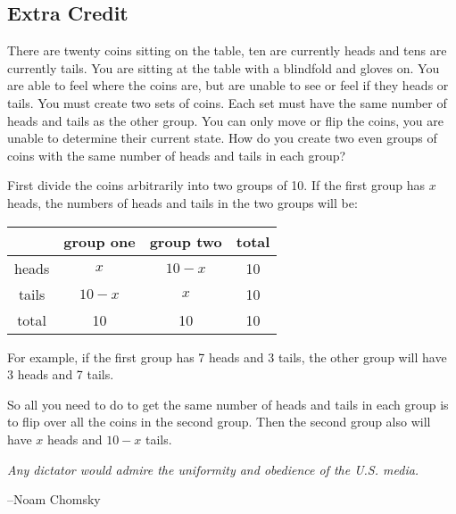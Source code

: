 \documentclass[fleqn,addpoints]{exam}
\begin{document}

\fi

\subsection{Extra Credit}
\begin{questions}

\question

There are twenty coins sitting on the table, ten are currently heads and tens are currently tails. You are sitting at
the table with a blindfold and gloves on. You are able to feel where the coins are, but are unable to see or feel if
they heads or tails. You must create two sets of coins. Each set must have the same number of heads and tails as the
other group. You can only move or flip the coins, you are unable to determine their current state. How do you create two
even groups of coins with the same number of heads and tails in each group?

\begin{solution}

First divide the coins arbitrarily into two groups of 10.  If the first group has $x$ heads, the numbers of heads and
tails in the two groups will be:

\begin{tabular}{|c||c|c||c|}
\hline
         & group one & group two & total   \\
\hline
   heads &    $x$      &    $10-x$   & 10      \\
   tails &    $10-x$   &    $x$      & 10      \\
\hline
   total &    10     &    10     & 10      \\
\hline
\end{tabular}

For example, if the first group has 7 heads and 3 tails, the other group will have 3 heads and 7 tails.  

So all you need to do to get the same number of heads and tails in each group is to flip over all the coins in the
second group.  Then the second group also will have $x$ heads and $10-x$ tails.

\end{solution}

\end{questions}

\ifprintanswers
\else
\vspace{5 in}


{\em Any dictator would admire the uniformity and obedience of the U.S. media.}

\vspace{.1 cm}
\hspace{1 cm} --Noam Chomsky

\fi
\end{document}
